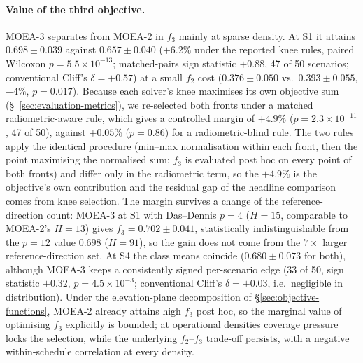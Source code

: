 \documentclass[preprint,12pt,authoryear]{elsarticle}
\begin{document}
\paragraph{Value of the third objective.}\label{par:third-objective}
MOEA-3 separates from MOEA-2 in $f_3$ mainly at sparse density. At S1 it
attains $0.698\pm0.039$ against $0.657\pm0.040$ ($+6.2\%$ under the reported
knee rules, paired Wilcoxon $p = 5.5\times10^{-13}$; matched-pairs sign
statistic $+0.88$, 47 of 50 scenarios; conventional Cliff's $\delta = +0.57$)
at a small $f_2$ cost ($0.376\pm0.050$ vs.\ $0.393\pm0.055$, $-4\%$,
$p = 0.017$). Because each solver's knee maximises its own objective sum
(\S~\ref{sec:evaluation-metrics}), we re-selected both fronts under a matched
radiometric-aware rule, which gives a controlled margin of $+4.9\%$
($p = 2.3\times10^{-11}$, 47 of 50), against $+0.05\%$ ($p = 0.86$) for a
radiometric-blind rule. The two rules apply the identical procedure (min--max
normalisation within each front, then the point maximising the normalised sum;
$f_3$ is evaluated post hoc on every point of both fronts) and differ only in
the radiometric term, so the $+4.9\%$ is the objective's own contribution and
the residual gap of the headline comparison comes from knee selection. The
margin survives a change of the reference-direction count: MOEA-3 at S1 with
Das--Dennis $p=4$ ($H=15$, comparable to MOEA-2's $H=13$) gives
$f_3 = 0.702\pm0.041$, statistically indistinguishable from the $p=12$ value
$0.698$ ($H=91$), so the gain does not come from the $7\times$ larger
reference-direction set. At S4 the class means coincide ($0.680\pm0.073$ for
both), although MOEA-3 keeps a consistently signed per-scenario edge (33 of 50,
sign statistic $+0.32$, $p = 4.5\times10^{-3}$; conventional Cliff's
$\delta = +0.03$, i.e.\ negligible in distribution). Under the elevation-plane
decomposition of \S\ref{sec:objective-functions}, MOEA-2 already attains high
$f_3$ post hoc, so the marginal value of optimising $f_3$ explicitly is
bounded; at operational densities coverage pressure locks the selection, while
the underlying $f_2$--$f_3$ trade-off persists, with a negative
within-schedule correlation at every density.
\end{document}
